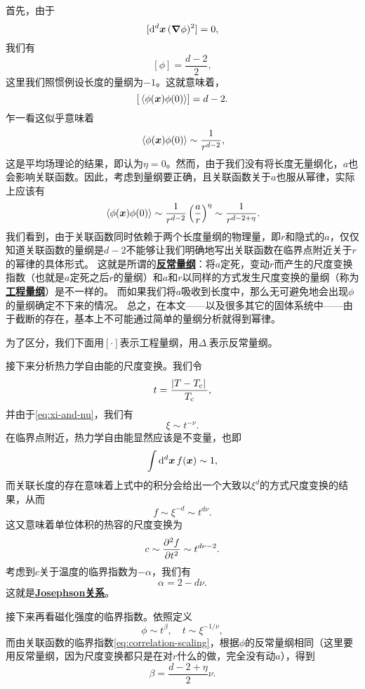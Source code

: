\documentclass[hyperref, UTF8, a4paper]{ctexart}
\newcommand*{\concept}[1]{\underline{\textbf{#1}}}
\begin{document}
首先，由于
\[
    [\dd[d]{\vb*{x}} (\grad{\phi})^2] = 0,
\]
我们有
\[
    [\phi] = \frac{d-2}{2},
\]
这里我们照惯例设长度的量纲为$-1$。这就意味着，
\[
    [\expval*{\phi(\vb*{x}) \phi(0)}] = d-2.
\]
乍一看这似乎意味着
\[
    \expval*{\phi(\vb*{x}) \phi(0)} \sim \frac{1}{r^{d-2}},
\]
这是平均场理论的结果，即认为$\eta=0$。然而，由于我们没有将长度无量纲化，$a$也会影响关联函数。因此，考虑到量纲要正确，且关联函数关于$a$也服从幂律，实际上应该有
\begin{equation}
    \expval*{\phi(\vb*{x}) \phi(0)} \sim \frac{1}{r^{d-2}} \left( \frac{a}{r} \right)^\eta \sim \frac{1}{r^{d-2+\eta}}.
    \label{eq:correlation-scaling}
\end{equation}
我们看到，由于关联函数同时依赖于两个长度量纲的物理量，即$r$和隐式的$a$，仅仅知道关联函数的量纲是$d-2$不能够让我们明确地写出关联函数在临界点附近关于$r$的幂律的具体形式。
这就是所谓的\concept{反常量纲}：将$a$定死，变动$r$而产生的尺度变换指数（也就是$a$定死之后$r$的量纲）和$a$和$r$以同样的方式发生尺度变换的量纲（称为\concept{工程量纲}）是不一样的。
而如果我们将$a$吸收到长度中，那么无可避免地会出现$\phi$的量纲确定不下来的情况。
总之，在本文——以及很多其它的固体系统中——由于截断的存在，基本上不可能通过简单的量纲分析就得到幂律。

为了区分，我们下面用$[\cdot]$表示工程量纲，用$\Delta_{\cdot}$表示反常量纲。

接下来分析热力学自由能的尺度变换。我们令
\begin{equation}
    t = \frac{\abs*{T-T_\text{c}}}{T_\text{c}},
\end{equation}
并由于\eqref{eq:xi-and-nu}，我们有
\begin{equation}
    \xi \sim t^{-\nu}.
\end{equation}
在临界点附近，热力学自由能显然应该是不变量，也即
\[
    \int \dd[d]{\vb*{x}} f(\vb*{x}) \sim 1,
\]
而关联长度的存在意味着上式中的积分会给出一个大致以$\xi^d$的方式尺度变换的结果，从而
\begin{equation}
    f \sim \xi^{-d} \sim t^{d\nu}.
\end{equation}
这又意味着单位体积的热容的尺度变换为
\[
    c \sim \pdv[2]{f}{t} \sim t^{d\nu-2}.
\]
考虑到$c$关于温度的临界指数为$-\alpha$，我们有
\begin{equation}
    \alpha = 2 - d \nu.
    \label{eq:josephson-relation}
\end{equation}
这就是\concept{Josephson关系}。

接下来再看磁化强度的临界指数。依照定义
\[
    \phi \sim t^\beta, \quad t \sim \xi^{-1/\nu},
\]
而由关联函数的临界指数\eqref{eq:correlation-scaling}，根据$\phi$的反常量纲相同（这里要用反常量纲，因为尺度变换都只是在对$r$什么的做，完全没有动$a$），得到
\begin{equation}
    \beta = \frac{d-2+\eta}{2}\nu.
\end{equation}
\end{document}
